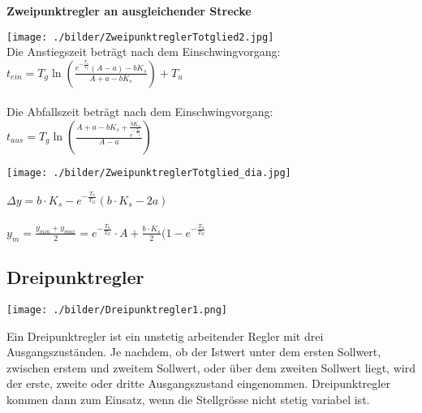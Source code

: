 	\vspace{.5cm}
		\textbf{Zweipunktregler an ausgleichender Strecke } \\
		\begin{minipage}{9cm}
 		\texttt{[image: ./bilder/ZweipunktreglerTotglied2.jpg]}\\
			Die Anstiegszeit beträgt nach dem Einschwingvorgang:
			$\boxed{t_{ein} = T_g\ln(\frac{e^{-\frac{T_u}{T_g}}(A-a)-b K_s}{A+a-b K_s})+T_u}$\\ \\
			Die Abfallszeit beträgt nach dem Einschwingvorgang:
			$\boxed{t_{aus} = T_g\ln(\frac{A+a-b
			K_s+\frac{b K_s}{e^{-\frac{T_u}{T_g}}}}{A-a})}$\\
        \end{minipage}
		\begin{minipage}{9cm}
		\texttt{[image: ./bilder/ZweipunktreglerTotglied\_dia.jpg]}			
        \end{minipage}
    
 	$\Delta y = b\cdot K_s - e^{-\frac{T_u}{T_G}}(b\cdot K_s - 2a) \quad$\\ \\
	$y_m = \frac{y_{min}+y_{max}}{2}=e^{-\frac{T_u}{T_G}}\cdot A + \frac{b\cdot K_s}{2}(1-e^{-\frac{T_u}{T_G}}$
\newpage


\subsection{Dreipunktregler }		
\begin{minipage}{5cm}
 		\texttt{[image: ./bilder/Dreipunktregler1.png]}
\end{minipage}
		\begin{minipage}{14cm}
        Ein Dreipunktregler ist ein unstetig arbeitender Regler mit drei Ausgangszuständen. Je nachdem, ob der Istwert unter dem ersten Sollwert, zwischen erstem und zweitem Sollwert, oder über dem zweiten Sollwert liegt, wird der erste, zweite oder dritte Ausgangszustand eingenommen. Dreipunktregler kommen dann zum Einsatz, wenn die Stellgrösse nicht stetig variabel ist. 
        \end{minipage}
       
		